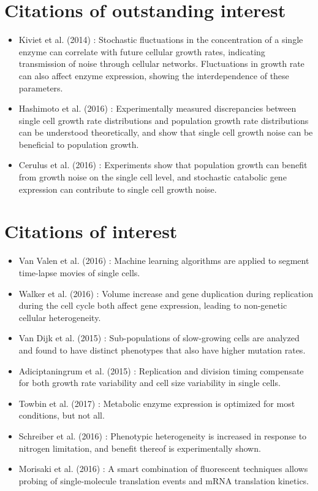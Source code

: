 \section*{Citations of outstanding interest}
\begin{itemize}
\item Kiviet et al. (2014) \cite{Kiviet2014}:
Stochastic fluctuations in the concentration of a single enzyme can correlate with future cellular growth rates, indicating transmission of noise through cellular networks. Fluctuations in growth rate can also affect enzyme expression, showing the interdependence of these parameters.
\item Hashimoto et al. (2016) \cite{Hashimoto2016}:
Experimentally measured discrepancies between single cell growth rate distributions and population growth rate distributions can be understood theoretically, and show that single cell growth noise can be beneficial to population growth.
\item Cerulus et al. (2016) \cite{Cerulus2016}:
Experiments show that population growth can benefit from growth noise on the single cell level, and stochastic catabolic gene expression can contribute to single cell growth noise.
\end{itemize}

\section*{Citations of interest}
\begin{itemize}
    \item Van Valen et al. (2016) \cite{VanValen2016}:
    Machine learning algorithms are applied to segment time-lapse movies of single cells.
    \item Walker et al. (2016) \cite{Walker2016}:
    Volume increase and gene duplication during replication during the cell cycle both affect gene expression, leading to non-genetic cellular heterogeneity.
    \item Van Dijk et al. (2015) \cite{VanDijk2015}:
    Sub-populations of slow-growing cells are analyzed and found to have distinct phenotypes that also have higher mutation rates.
    \item Adiciptaningrum et al. (2015) \cite{Adiciptaningrum2015}:
    Replication and division timing compensate for both growth rate variability and cell size variability in single cells.
    \item Towbin et al. (2017) \cite{Towbin2017}:
    Metabolic enzyme expression is optimized for most conditions, but not all.
    \item Schreiber et al. (2016) \cite{Schreiber2016}:
    Phenotypic heterogeneity is increased in response to nitrogen limitation, and benefit thereof is experimentally shown.
    \item Morisaki et al. (2016) \cite{Morisaki2016}:
    A smart combination of fluorescent techniques allows probing of single-molecule translation events and mRNA translation kinetics.
\end{itemize}



